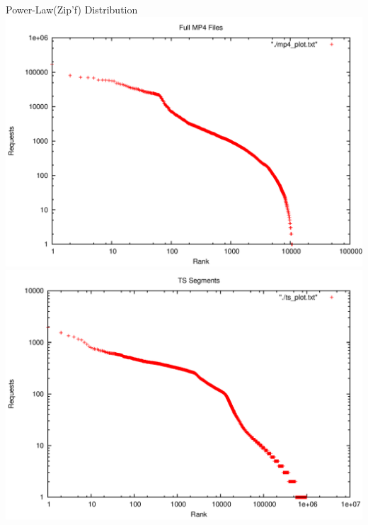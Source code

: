 \documentclass{beamer}
\begin{document}
\begin{frame}{Power-Law(Zip'f) Distribution}
\includegraphics[scale=0.4]{fig/mp4.png}\hspace*{0.1cm}
\includegraphics[scale=0.4]{fig/ts.png}
\end{frame}
\end{document}
